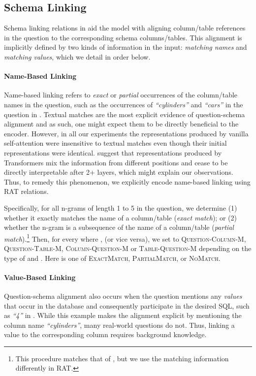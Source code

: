 \documentclass[11pt,a4paper,final]{article}
\begin{document}
\subsection{Schema Linking}
\label{sec:schema-linking}
Schema linking relations in  aid the model with aligning column/table
references in the question to the corresponding schema columns/tables.
This alignment is implicitly defined by two kinds of information in the input: \emph{matching names} and \emph{matching
values}, which we detail in order below.

\paragraph{Name-Based Linking}
Name-based linking refers to \emph{exact} or \emph{partial} occurrences of the column/table names in the question,
such as the occurrences of \emph{``cylinders''} and \emph{``cars''} in the question in .
Textual matches are the most explicit evidence of question-schema alignment and as such, one might expect them to be
directly beneficial to the encoder.
However, in all our experiments the representations produced by vanilla self-attention were insensitive to
textual matches even though their initial representations were identical.
\citet{brunner2019identifiability} suggest that representations produced by Transformers mix the information from
different positions and cease to be directly interpretable after 2+ layers, which might explain our observations.
Thus, to remedy this phenomenon, we explicitly encode name-based linking using RAT relations.

Specifically, for all n-grams of length 1 to 5 in the question,
we determine (1) whether it exactly matches the name of a column/table (\emph{exact match});
or (2) whether the n-gram is a subsequence of the name of a column/table (\emph{partial match}).\footnote{This procedure
matches that of \citet{irnet}, but we use the matching information differently in RAT.}
Then, for every  where ,  (or vice versa), we set
 to
\textsc{Question-Column}-\textsf{M}, \textsc{Question-Table}-\textsf{M}, \textsc{Column-Question}-\textsf{M} or
\textsc{Table-Question}-\textsf{M} depending on the type of  and .
Here  is one of \textsc{ExactMatch}, \textsc{PartialMatch}, or \textsc{NoMatch}.


\paragraph{Value-Based Linking}
Question-schema alignment also occurs when the question mentions any \emph{values} that occur in the database and
consequently participate in the desired SQL, such as \emph{``4''} in .
While this example makes the alignment explicit by mentioning the column name \emph{``cylinders''}, many real-world
questions do not.
Thus, linking a value to the corresponding column requires background knowledge.
\end{document}
